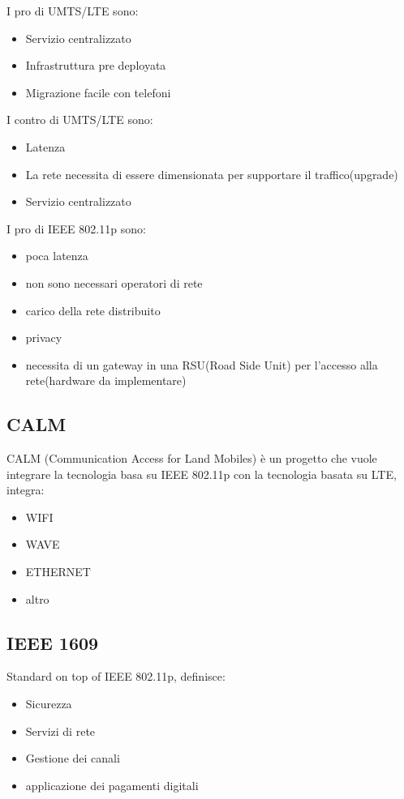 I pro di UMTS/LTE sono:
\begin{itemize}
	\item Servizio centralizzato
	\item Infrastruttura pre deployata
	\item Migrazione facile con telefoni
\end{itemize}

I contro di UMTS/LTE sono:
\begin{itemize}
	\item Latenza
	\item La rete necessita di essere dimensionata per supportare il traffico(upgrade)
	\item Servizio centralizzato
\end{itemize}

I pro di IEEE 802.11p sono:
\begin{itemize}
	\item poca latenza
	\item non sono necessari operatori di rete
	\item carico della rete distribuito
	\item privacy
\end{itemize}

\begin{itemize}
	\item necessita di un gateway in una RSU(Road Side Unit) per l'accesso alla rete(hardware da
	      implementare)
\end{itemize}


\subsection{CALM}
CALM (Communication Access for Land Mobiles) \`e un progetto che vuole integrare la tecnologia
basa su IEEE 802.11p con la tecnologia basata su LTE, integra:
\begin{itemize}
	\item WIFI
	\item WAVE
	\item ETHERNET
	\item altro
\end{itemize}

\subsection{IEEE 1609}

Standard on top of IEEE 802.11p, definisce:
\begin{itemize}
	\item Sicurezza
	\item Servizi di rete
	\item Gestione dei canali
	\item applicazione dei pagamenti digitali
\end{itemize}



